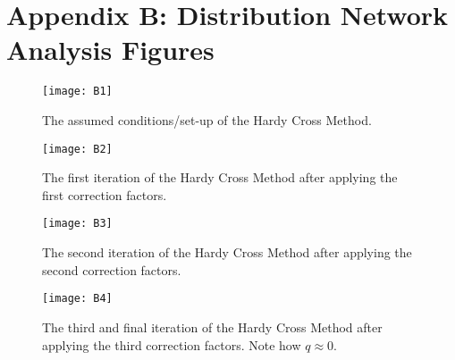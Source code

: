 \documentclass[]{article}
\begin{document}
\section{Appendix B: Distribution Network Analysis Figures}
	\begin{figure}[H]
	\centering
	\texttt{[image: B1]}
	\caption[Hardy Cross Method: Assumed Conditions]{The assumed conditions/set-up of the Hardy Cross Method.}
\end{figure}
	\begin{figure}[H]
	\centering
	\texttt{[image: B2]}
	\caption[Hardy Cross Method: First Iteration]{The first iteration of the Hardy Cross Method after applying the first correction factors.}
\end{figure}
		\begin{figure}[H]
		\centering
		\texttt{[image: B3]}
		\caption[Hardy Cross Method: Second Iteration]{The second iteration of the Hardy Cross Method after applying the second correction factors.}
	\end{figure}
		\begin{figure}[H]
	\centering
	\texttt{[image: B4]}
	\caption[Hardy Cross Method: Third Iteration]{The third and final iteration of the Hardy Cross Method after applying the third correction factors. Note how $q \approx 0$.}
\end{figure}
	
\end{document}

